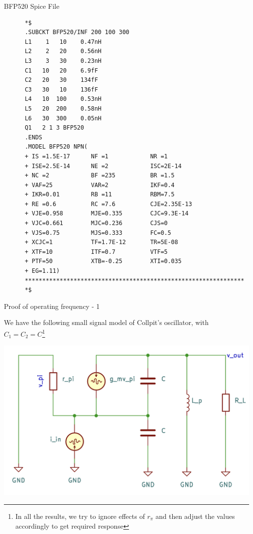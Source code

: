 \documentclass{beamer}
\begin{document}
\begin{frame}[fragile]{BFP520 Spice File}
  \begin{tiny}
    \begin{lstlisting}
      *$
      .SUBCKT BFP520/INF 200 100 300
      L1    1   10    0.47nH
      L2    2   20    0.56nH
      L3    3   30    0.23nH
      C1   10   20    6.9fF
      C2   20   30    134fF
      C3   30   10    136fF
      L4   10  100    0.53nH
      L5   20  200    0.58nH
      L6   30  300    0.05nH
      Q1   2 1 3 BFP520
      .ENDS
      .MODEL BFP520 NPN(
      + IS =1.5E-17      NF =1            NR =1
      + ISE=2.5E-14      NE =2            ISC=2E-14
      + NC =2            BF =235          BR =1.5
      + VAF=25           VAR=2            IKF=0.4
      + IKR=0.01         RB =11           RBM=7.5
      + RE =0.6          RC =7.6          CJE=2.35E-13
      + VJE=0.958        MJE=0.335        CJC=9.3E-14
      + VJC=0.661        MJC=0.236        CJS=0
      + VJS=0.75         MJS=0.333        FC=0.5
      + XCJC=1           TF=1.7E-12       TR=5E-08
      + XTF=10           ITF=0.7          VTF=5
      + PTF=50           XTB=-0.25        XTI=0.035
      + EG=1.11)
      ***************************************************************
      *$
    \end{lstlisting}
  \end{tiny}
  
  \end{frame}




\begin{frame}{Proof of operating frequency - 1}

  We have the following small signal model of Collpit's oscillator, with \(C_1 = C_2 = C\)\footnote{In all the results, we try to ignore effects of \(r_\pi\) and then adjust the values accordingly to get required response}
  \begin{center}
    \includegraphics[width = 0.7\linewidth]{images/ssm.png}
  \end{center}
  
\end{frame}
\end{document}
